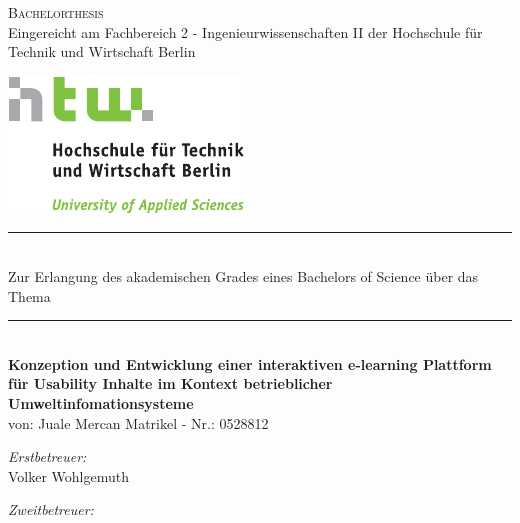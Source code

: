 \newcommand{\HRule}{\rule{\linewidth}{0.0mm}}
\thispagestyle{empty}
\begin{titlepage}
\begin{center}
\textsc{\LARGE Bachelorthesis}\\[0.5cm]
%
{Eingereicht am Fachbereich 2 - Ingenieurwissenschaften II der Hochschule für Technik und Wirtschaft Berlin}\\[0.5cm]

\begin{minipage}{0.25\linewidth}

\includegraphics[viewport=0 0 60 60]{HTW_Logo_4c.pdf}

\end{minipage}

\HRule \\[0.2cm]
\large {Zur Erlangung des akademischen Grades eines \linebreak Bachelors of Science \linebreak über das Thema}
%

\HRule \\[0.5 cm]
{ \LARGE \bfseries Konzeption und Entwicklung einer \linebreak interaktiven e-learning
Plattform \linebreak für Usability Inhalte im Kontext \linebreak betrieblicher
Umweltinfomationsysteme}\\[2.0 cm]%

% 


{von: Juale Mercan \linebreak \small Matrikel - Nr.: 0528812}\\[1.0cm]

\begin{minipage}{0.4\textwidth}
\begin{flushleft} \normalsize
\emph{Erstbetreuer:}\\ Volker Wohlgemuth
\end{flushleft}
\end{minipage}
\begin{minipage}{0.4\textwidth}
\begin{flushright} \normalsize
\emph{Zweitbetreuer:} \\  


\end{flushright}
\end{minipage}
\end{center}
\end{titlepage}
